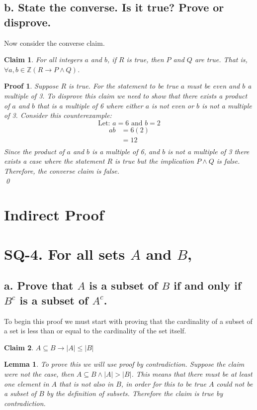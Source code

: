 \documentclass{article}
\newtheorem*{claim}{Claim}
\newtheorem*{lemma}{Lemma}
\newtheorem*{poof}{Proof}
\begin{document}
\subsection*{b. State the converse. Is it true? Prove or disprove.}
Now consider the converse claim.
\begin{claim}
For all integers $a$ and $b$, if $R$ is true, then $P$ and $Q$ are true. That is, $\forall a, b \in \mathbb{Z} (R \rightarrow P \wedge Q)$.
\end{claim}

\begin{poof}
Suppose $R$ is true. For the statement to be true $a$ must be even and $b$ a multiple of 3. To disprove this claim we need to show that there exists a product of $a$ and $b$ that is a multiple of 6 where either $a$ is not even or $b$ is not a multiple of 3. Consider this counterexample:
\[\text{Let: } a = 6 \text{ and } b = 2 \]
\begin{align*}
       ab &= 6(2) \\
       &= 12 \\
\end{align*}
Since the product of $a$ and $b$ is a multiple of 6, and $b$ is not a multiple of 3 there exists a case where the statement $R$ is true but the implication $P \wedge Q$ is false. Therefore, the converse claim is false. \\
\qed\end{poof}
\newpage
\section*{Indirect Proof}
\section*{SQ-4. For all sets $A$ and $B$,}
\subsection*{a. Prove that $A$ is a subset of $B$ if and only if $B^c$ is a subset of $A^c$.}
To begin this proof we must start with proving that the cardinality of a subset of a set is less than or equal to the cardinality of the set itself.
\begin{claim}
    $A \subseteq B \rightarrow |A| \leq |B|$
\end{claim}
\begin{lemma}
    To prove this we will use proof by contradiction. Suppose the claim were not the case, then $A \subseteq B \wedge |A| > |B|$. This means that there must be at least one element in $A$ that is not also in $B$, in order for this to be true $A$ could not be a subset of $B$ by the definition of subsets. Therefore the claim is true by contradiction.
\end{lemma}
    
\end{document}
